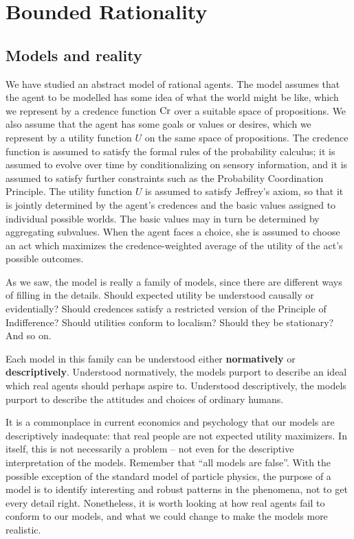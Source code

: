 \chapter{Bounded Rationality}

\section{Models and reality}

We have studied an abstract model of rational agents. The model
assumes that the agent to be modelled has some idea of what the world
might be like, which we represent by a credence function $\text{Cr}$ over a
suitable space of propositions. We also assume that the agent has some
goals or values or desires, which we represent by a utility function
$U$ on the same space of propositions. The credence function is
assumed to satisfy the formal rules of the probability calculus; it is
assumed to evolve over time by conditionalizing on sensory
information, and it is assumed to satisfy further constraints such as
the Probability Coordination Principle. The utility function $U$ is
assumed to satisfy Jeffrey's axiom, so that it is jointly determined
by the agent's credences and the basic values assigned to individual
possible worlds. The basic values may in turn be determined by
aggregating subvalues. When the agent faces a choice, she is assumed
to choose an act which maximizes the credence-weighted average of the
utility of the act's possible outcomes.

As we saw, the model is really a family of models, since there are
different ways of filling in the details. Should expected utility be
understood causally or evidentially? Should credences satisfy a
restricted version of the Principle of Indifference? Should utilities
conform to localism?  Should they be stationary? And so on.

Each model in this family can be understood either
\textbf{normatively} or \textbf{descriptively}. Understood
normatively, the models purport to describe an ideal which real agents
should perhaps aspire to. Understood descriptively, the models purport
to describe the attitudes and choices of ordinary humans.

It is a commonplace in current economics and psychology that our
models are descriptively inadequate: that real people are not expected
utility maximizers. In itself, this is not necessarily a problem --
not even for the descriptive interpretation of the models. Remember
that ``all models are false''. With the possible exception of the
standard model of particle physics, the purpose of a model is to
identify interesting and robust patterns in the phenomena, not to get
every detail right.  Nonetheless, it is worth looking at how real
agents fail to conform to our models, and what we could change to make
the models more realistic.


